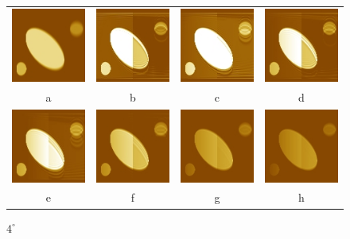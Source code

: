 \documentclass{procDDs}
\begin{document}
\begin{figure}[h!]\center
	\begin{tabular}{cccc}
		\includegraphics[width=0.2\linewidth]{img/7/1.jpg}
		&
		\includegraphics[width=0.2\linewidth]{img/7/3.jpg}
		&
		\includegraphics[width=0.2\linewidth]{img/7/4.jpg}
		&
		\includegraphics[width=0.2\linewidth]{img/7/5.jpg}
		\\
		a & b & c & d
		\\
		\includegraphics[width=0.2\linewidth]{img/7/6.jpg}
		&
		\includegraphics[width=0.2\linewidth]{img/7/7.jpg}
		&
		\includegraphics[width=0.2\linewidth]{img/7/8.jpg}
		&
		\includegraphics[width=0.2\linewidth]{img/7/9.jpg}
		\\
		e & f & g & h
	\end{tabular}
	\caption{$4^\circ$}
	\label{ris:desc3}
\end{figure}
\end{document}
